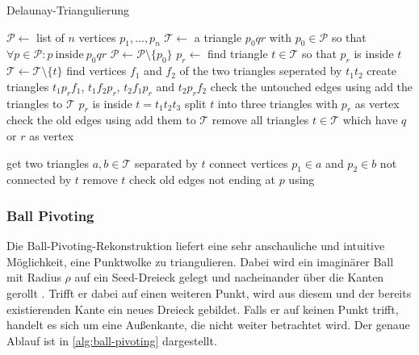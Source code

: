 \begin{algorithm}
\caption[Delaunay-Triangulierung]{Delaunay-Triangulierung \cite[200--201]{berg2000comp}}
\label{alg:delaunay-triangulierung}
\begin{algorithmic}
\State $\mathcal{P} \gets$ list of $n$ vertices $p_1, \dots, p_n$
\State $\mathcal{T} \gets$ a triangle $p_0 q r$ with $p_0 \in \mathcal{P}$ so that $\forall p \in \mathcal{P} : p \mathrm{\ inside\ } p_0 q r$
\State $\mathcal{P} \gets \mathcal{P} \setminus \{p_0\}$
	\State $p_r \gets$ 
	\State find triangle $t \in \mathcal{T}$ so that $p_r$ is inside $t$
	\State $\mathcal{T} \gets \mathcal{T} \setminus \{t\}$
		\State find vertices $f_1$ and $f_2$ of the two triangles seperated by $t_1t_2$
		\State create triangles $t_1p_rf_1$, $t_1f_2p_r$, $t_2f_1p_r$ and $t_2p_rf_2$
		\State check the untouched edges using 
		\State add the triangles to $\mathcal{T}$
	\Else
		\State $p_r$ is inside $t = t_1t_2t_3$
		\State split $t$ into three triangles with $p_r$ as vertex
		\State check the old edges using 
		\State add them to $\mathcal{T}$
	\EndIf
	\State remove all triangles $t \in \mathcal{T}$ which have $q$ or $r$ as vertex
\EndWhile
\State {}

		\State get two triangles $a, b \in \mathcal{T}$ separated by $t$
		\State connect vertices $p_1 \in a$ and $p_2 \in b$ not connected by $t$
		\State remove $t$
		\State check old edges not ending at $p$ using 
	\EndIf
\EndFunction
\end{algorithmic}
\end{algorithm}


\subsubsection{Ball Pivoting}
\label{subsubsection:ball-pivoting}

Die Ball-Pivoting-Rekonstruktion liefert eine sehr anschauliche und intuitive Möglichkeit, eine Punktwolke zu triangulieren.
Dabei wird ein imaginärer Ball mit Radius $\rho$ auf ein Seed-Dreieck gelegt und nacheinander über die Kanten gerollt \cite{bernardini1999ball}.
Trifft er dabei auf einen weiteren Punkt, wird aus diesem und der bereits existierenden Kante ein neues Dreieck gebildet.
Falls er auf keinen Punkt trifft, handelt es sich um eine Außenkante, die nicht weiter betrachtet wird.
Der genaue Ablauf ist in \autoref{alg:ball-pivoting} dargestellt.

